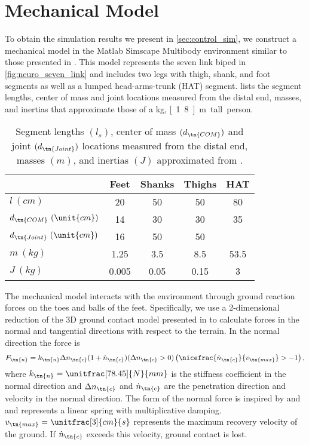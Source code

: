 \section{Mechanical Model}\label{sec:neuro_mech_model}

To obtain the simulation results we present in \cref{sec:control_sim}, we
construct a mechanical model in the Matlab Simscape Multibody environment
similar to those presented in \citet{geyer2010muscle, song2013integration,
song2015neural}. This model represents the seven link biped in
\cref{fig:neuro_seven_link} and includes two legs with thigh, shank, and foot
segments as well as a lumped head-arms-trunk (HAT) segment.
 lists the segment lengths, center of mass and joint
locations measured from the distal end, masses, and inertias that approximate
those of a \unit[80]{kg}, \unit[1.8]{m} tall person.

\begin{table}[b]
  \centering
      \begin{tabular}{lcccc}
        \toprule
        & Feet & Shanks & Thighs & HAT \\
        \midrule
        $l         \ (\unit{cm})$ & 20    & 50   & 50   & 80   \\
        $d_\tn{COM}   \ (\unit{cm})$ & 14    & 30   & 30   & 35   \\
        $d_\tn{Joint} \ (\unit{cm})$ & 16    & 50   & 50   &      \\
        $m         \ (\unit{kg})$ & 1.25  & 3.5  & 8.5  & 53.5 \\
        $J         \ (\unit{kg})$ & 0.005 & 0.05 & 0.15 & 3    \\
        \bottomrule
      \end{tabular}
  \caption{Segment lengths $(l_s)$, center of mass $(d_\tn{COM})$ and joint
  $(d_\tn{Joint})$ locations measured from the distal end, masses $(m)$, and
  inertias $(J)$ approximated from
  \citet{gunther2003synthesis}.}\label{tab:model_mech_params}
\end{table}

The mechanical model interacts with the environment through ground reaction
forces on the toes and balls of the feet. Specifically, we use a 2-dimensional
reduction of the 3D ground contact model presented in
\citet{song2013generalization} to calculate forces in the normal and
tangential directions with respect to the terrain. In the normal direction the
force is
\begin{align}
    F_\tn{n} = k_\tn{n} \Delta n_\tn{c} (1 + \dot n_\tn{c}) 
        (\Delta n_\tn{c} > 0)
    \left(\nicefrac{\dot n_\tn{c}}{v_\tn{max}} > -1 \right),
    \label{eq:grf_n}
\end{align}
where $k_\tn{n} = \unitfrac[78.45]{N}{mm}$ is the stiffness coefficient in the
normal direction and $\Delta n_\tn{c}$ and $\dot n_\tn{c}$ are the penetration
direction and velocity in the normal direction. The form of the normal force is
inspired by \citet{gunther2003synthesis} and \citet{scott1993biomechanical} and
represents a linear spring with multiplicative damping.  $v_\tn{max} =
\unitfrac[3]{cm}{s}$ represents the maximum recovery velocity of the ground. If
$\dot n_\tn{c}$ exceeds this velocity, ground contact is lost.


